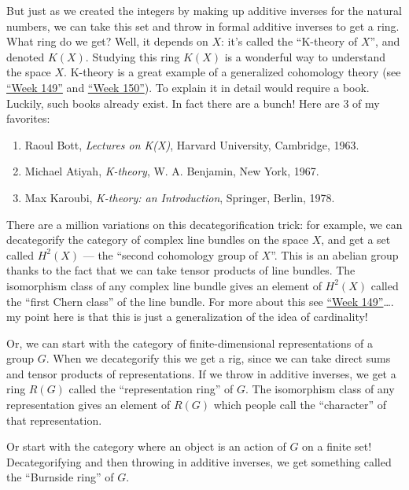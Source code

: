 \documentclass{article}
\begin{document}
But just as we created the integers by making up additive inverses for
the natural numbers, we can take this set and throw in formal additive
inverses to get a ring. What ring do we get? Well, it depends on \(X\):
it's called the ``K-theory of \(X\)'', and denoted \(K(X)\). Studying
this ring \(K(X)\) is a wonderful way to understand the space \(X\).
K-theory is a great example of a generalized cohomology theory (see
\protect\hyperlink{week149}{``Week 149''} and
\protect\hyperlink{week150}{``Week 150''}). To explain it in detail
would require a book. Luckily, such books already exist. In fact there
are a bunch! Here are 3 of my favorites:

\begin{enumerate}
\def\labelenumi{\arabic{enumi})}
\setcounter{enumi}{3}
\item
  Raoul Bott, \emph{Lectures on K(X)}, Harvard University, Cambridge,
  1963.
\item
  Michael Atiyah, \emph{K-theory}, W. A. Benjamin, New York, 1967.
\item
  Max Karoubi, \emph{K-theory: an Introduction}, Springer, Berlin, 1978.
\end{enumerate}

There are a million variations on this decategorification trick: for
example, we can decategorify the category of complex line bundles on the
space \(X\), and get a set called \(H^2(X)\) --- the ``second cohomology
group of \(X\)''. This is an abelian group thanks to the fact that we
can take tensor products of line bundles. The isomorphism class of any
complex line bundle gives an element of \(H^2(X)\) called the ``first
Chern class'' of the line bundle. For more about this see
\protect\hyperlink{week149}{``Week 149''}\ldots. my point here is that
this is just a generalization of the idea of cardinality!

Or, we can start with the category of finite-dimensional representations
of a group \(G\). When we decategorify this we get a rig, since we can
take direct sums and tensor products of representations. If we throw in
additive inverses, we get a ring \(R(G)\) called the ``representation
ring'' of \(G\). The isomorphism class of any representation gives an
element of \(R(G)\) which people call the ``character'' of that
representation.

Or start with the category where an object is an action of \(G\) on a
finite set! Decategorifying and then throwing in additive inverses, we
get something called the ``Burnside ring'' of \(G\).
\end{document}
